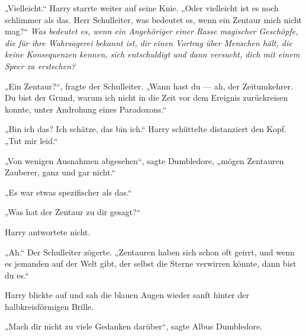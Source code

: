 „Vielleicht.“ Harry starrte weiter auf seine Knie.
„Oder vielleicht ist es noch schlimmer als das. Herr Schulleiter, was bedeutet es, wenn ein Zentaur mich nicht mag?“
\emph{Was bedeutet es, wenn ein Angehöriger einer Rasse magischer Geschöpfe, die für ihre Wahrsagerei bekannt ist, dir einen Vortrag über Menschen hält, die keine Konsequenzen kennen, sich entschuldigt und dann versucht, dich mit einem Speer zu erstechen?}

„Ein Zentaur?“, fragte der Schulleiter.
„Wann hast du — ah, der Zeitumkehrer. Du bist der Grund, warum ich nicht in die Zeit vor dem Ereignis zurückreisen konnte, unter Androhung eines Paradoxons.“

„Bin ich das? Ich schätze, das bin ich.“ Harry schüttelte distanziert den Kopf.
„Tut mir leid.“

„Von wenigen Ausnahmen abgesehen“, sagte Dumbledore, „mögen Zentauren Zauberer, ganz und gar nicht.“

„Es war etwas spezifischer als das.“

„Was hat der Zentaur zu dir gesagt?“

Harry antwortete nicht.

„Ah.“ Der Schulleiter zögerte.
„Zentauren haben sich schon oft geirrt, und wenn es jemanden auf der Welt gibt, der selbst die Sterne verwirren könnte, dann bist du es.“

Harry blickte auf und sah die blauen Augen wieder sanft hinter der halbkreisförmigen Brille.

„Mach dir nicht zu viele Gedanken darüber“, sagte Albus Dumbledore.

